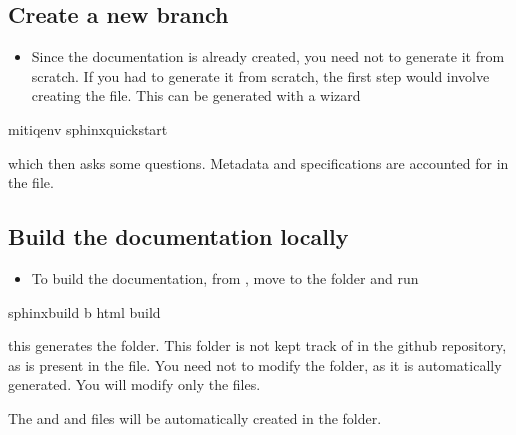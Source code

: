 \documentclass[letterpaper,10pt,english]{sphinxmanual}
\begin{document}
\subsection{Create a new branch}
\label{\detokenize{README-docs:id1}}\begin{itemize}
\item {} 
Since the documentation is already created, you need not to generate it
from scratch. If you had to generate it from scratch, the first step would
involve creating the  file. This can be generated with a wizard

\end{itemize}

\begin{sphinxVerbatim}[commandchars=\\\{\}]
mitiqenv sphinx\PYGZhy{}quickstart
\end{sphinxVerbatim}

which then asks some questions. Meta\sphinxhyphen{}data and specifications are accounted for
in the  file.


\subsection{Build the documentation locally}
\label{\detokenize{README-docs:build-the-documentation-locally}}\begin{itemize}
\item {} 
To build the documentation, from , move to the  folder and run

\end{itemize}

\begin{sphinxVerbatim}[commandchars=\\\{\}]
sphinx\PYGZhy{}build \PYGZhy{}b html  build
\end{sphinxVerbatim}

this generates the  folder. This folder is not kept track of in the
github repository, as  is present in the  file.
You need not to modify the  folder, as it is automatically
generated. You will modify only the  files.

The  and   and  files will be automatically created in the
 folder.
\end{document}
